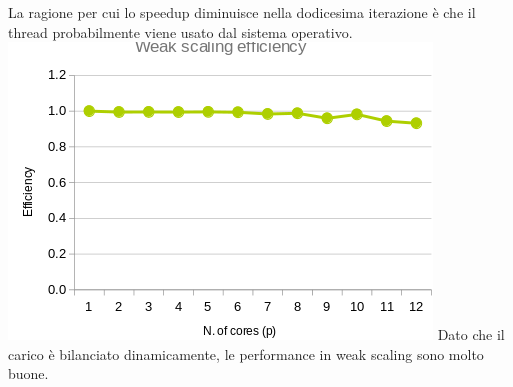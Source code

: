 \documentclass[a4paper,12pt, twoside]{report}
\begin{document}
La ragione per cui lo speedup diminuisce nella dodicesima iterazione è che il thread probabilmente viene usato dal sistema operativo.
\newline
\newline
\includegraphics[scale=0.5]{images/omp_weak.png}
\newline
Dato che il carico è bilanciato dinamicamente, le performance in weak scaling sono molto buone.
\end{document}

